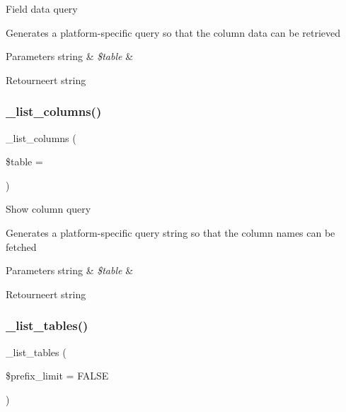 Field data query

Generates a platform-\/specific query so that the column data can be retrieved


\begin{DoxyParams}[1]{Parameters}
string & {\em \$table} & \\
\hline
\end{DoxyParams}
\begin{DoxyReturn}{Retourneert}
string 
\end{DoxyReturn}
\mbox{\label{class_c_i___d_b__odbc__driver_a7ccb7f9c301fe7f0a9db701254142b63}} 
\subsubsection{\texorpdfstring{\_list\_columns()}{\_list\_columns()}}
{\footnotesize\ttfamily \+\_\+list\+\_\+columns (\begin{DoxyParamCaption}\item[{}]{\$table = {\ttfamily \textquotesingle{}\textquotesingle{}} }\end{DoxyParamCaption})\hspace{0.3cm}{\ttfamily [protected]}}

Show column query

Generates a platform-\/specific query string so that the column names can be fetched


\begin{DoxyParams}[1]{Parameters}
string & {\em \$table} & \\
\hline
\end{DoxyParams}
\begin{DoxyReturn}{Retourneert}
string 
\end{DoxyReturn}
\mbox{\label{class_c_i___d_b__odbc__driver_a435c0f3ce54fe7daa178baa8532ebd54}} 
\subsubsection{\texorpdfstring{\_list\_tables()}{\_list\_tables()}}
{\footnotesize\ttfamily \+\_\+list\+\_\+tables (\begin{DoxyParamCaption}\item[{}]{\$prefix\+\_\+limit = {\ttfamily FALSE} }\end{DoxyParamCaption})\hspace{0.3cm}{\ttfamily [protected]}}

